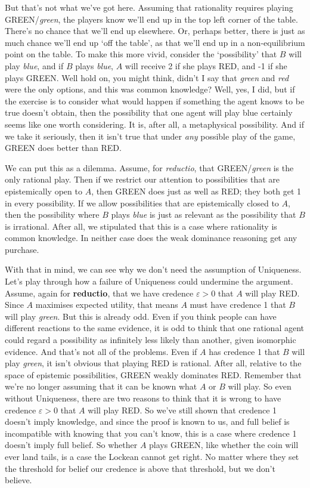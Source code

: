 But that's not what we've got here. Assuming that rationality requires playing GREEN/\textit{green}, the players know we'll end up in the top left corner of the table. There's no chance that we'll end up elsewhere. Or, perhaps better, there is just as much chance we'll end up `off the table', as that we'll end up in a non-equilibrium point on the table. To make this more vivid, consider the `possibility' that $B$ will play \textit{blue}, and if $B$ plays \textit{blue}, $A$ will receive 2 if she plays RED, and -1 if she plays GREEN. Well hold on, you might think, didn't I say that \textit{green} and \textit{red} were the only options, and this was common knowledge? Well, yes, I did, but if the exercise is to consider what would happen if something the agent knows to be true doesn't obtain, then the possibility that one agent will play blue certainly seems like one worth considering. It is, after all, a metaphysical possibility. And if we take it seriously, then it isn't true that under \textit{any} possible play of the game, GREEN does better than RED.

We can put this as a dilemma. Assume, for \textit{reductio}, that GREEN/\textit{green} is the only rational play. Then if we restrict our attention to possibilities that are epistemically open to $A$, then GREEN does just as well as RED; they both get 1 in every possibility. If we allow possibilities that are epistemically closed to $A$, then the possibility where $B$ plays \textit{blue} is just as relevant as the possibility that $B$ is irrational. After all, we stipulated that this is a case where rationality is common knowledge. In neither case does the weak dominance reasoning get any purchase.

With that in mind, we can see why we don't need the assumption of Uniqueness. Let's play through how a failure of Uniqueness could undermine the argument. Assume, again for \textbf{reductio}, that we have credence $\varepsilon > 0$ that $A$ will play RED. Since $A$ maximises expected utility, that means $A$ must have credence 1 that $B$ will play \textit{green}. But this is already odd. Even if you think people can have different reactions to the same evidence, it is odd to think that one rational agent could regard a possibility as infinitely less likely than another, given isomorphic evidence. And that's not all of the problems. Even if $A$ has credence 1 that $B$ will play \textit{green}, it isn't obvious that playing RED is rational. After all, relative to the space of epistemic possibilities, GREEN weakly dominates RED. Remember that we're no longer assuming that it can be known what $A$ or $B$ will play. So even without Uniqueness, there are two reasons to think that it is wrong to have credence $\varepsilon > 0$ that $A$ will play RED. So we've still shown that credence 1 doesn't imply knowledge, and since the proof is known to us, and full belief is incompatible with knowing that you can't know, this is a case where credence 1 doesn't imply full belief. So whether $A$ plays GREEN, like whether the coin will ever land tails, is a case the Lockean cannot get right. No matter where they set the threshold for belief our credence is above that threshold, but we don't believe. 

